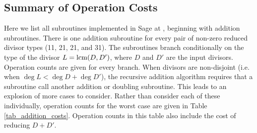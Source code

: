 \subsection{Summary of Operation Costs}

Here we list all subroutines implemented in Sage at \cite{github}, beginning with addition subroutines. There is one addition subroutine for every pair of non-zero reduced divisor types
(11, 21, 21, and 31).
The subroutines branch conditionally on the type of the divisor $L = \operatorname{lcm}(D, D')$,
where $D$ and $D'$ are the input divisors.
Operation counts are given for every branch.
When divisors are non-disjoint (i.e. when $\deg L < \deg D + \deg D'$),
the recursive addition algorithm requires that a subroutine call another addition or doubling subroutine.
This leads to an explosion of more cases to consider.
Rather than consider each of these individually, operation counts for the worst case are given in
Table \ref{tab_addition_costs}.
Operation counts in this table also include the cost of reducing $D + D'$.

